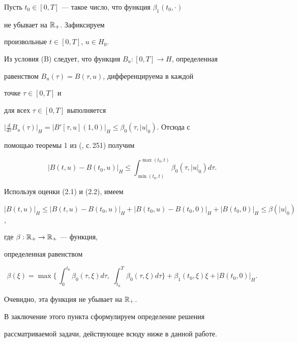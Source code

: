  


\begin{pf} 


Пусть $t_0\in[0,T]$ --- такое число, что функция $\beta_1(t_0,\cdot)$ 


не убывает на $\Bbb R_+$. Зафиксируем 


произвольные $t\in[0,T]$, $u\in H_0$. 


Из условия (B) следует, что функция $B_u:[0,T]\to H$, определенная 


равенством $B_u(\tau)=B(\tau,u)$, дифференцируема в каждой 


точке $\tau\in[0,T]$ и 


для всех $\tau\in[0,T]$ выполняется 


$\big|\frac{d}{d\tau}B_u(\tau)\big|_H=|B'[\tau,u](1,0)|_H\le 


\beta_0(\tau,|u|_0)$. Отсюда с 


помощью теоремы 1 из (\cite{15}, с.\,251) получим 


\begin{equation} 


|B(t,u)-B(t_0,u)|_H\le 


\int^{\max(t_0,t)}_{\min(t_0,t)}\beta_0(\tau,|u|_0)d\tau. 


\end{equation} 


Используя оценки (2.1) и (2.2), имеем 


$|B(t,u)|_H\le|B(t,u)-B(t_0,u)|_H+|B(t_0,u)-B(t_0,0)|_H+ 


|B(t_0,0)|_H\le\beta(|u|_0)$, 


где $\beta:\Bbb R_+\to\Bbb R_+$ --- функция, 


определенная равенством 


$$ 


\beta(\xi)=\max\bigg\{\,\int^{t_0}_0\beta_0(\tau,\xi)d\tau,\; 


\int^T_{t_0}\beta_0(\tau,\xi)d\tau\bigg\}+\beta_1(t_0,\xi)\xi+ 


|B(t_0,0)|_H. 


$$ 


Очевидно, эта функция не убывает на $\Bbb R_+$. 


\end{pf} 


 


В заключение этого пункта сформулируем определение решения 


рассматриваемой задачи, действующее всюду ниже в данной работе. 



